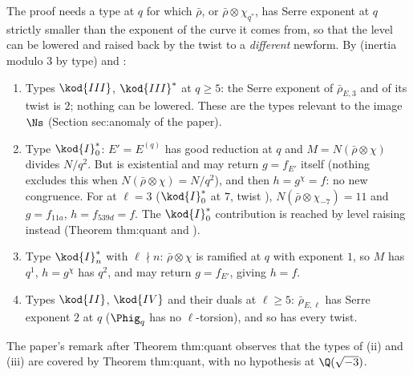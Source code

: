 \begin{remark}\label{rem:modgalrep:why-these-types}
The proof needs a type at $q$ for which $\bar\rho$, or $\bar\rho\otimes\chi_{q^*}$, has Serre exponent at $q$ strictly smaller than the exponent of the curve it comes from, so that
the level can be lowered and raised back by the twist to a \emph{different} newform. By  (inertia modulo $3$ by type) and
:
\begin{enumerate}[label=(\roman*)]
\item Types $\kod{III}$, $\kod{III}^*$ at $q\ge5$: the Serre exponent of $\bar\rho_{E,3}$ and of its twist is $2$; nothing can be lowered. These are the types relevant to the image
$\Ns$ (Section sec:anomaly of the paper).
\item Type $\kod{I}_0^*$: $E'=E^{(q)}$ has good reduction at $q$ and $M=N(\bar\rho\otimes\chi)$ divides $N/q^2$. But  is existential and may return
$g=f_{E'}$ itself (nothing excludes this when $N(\bar\rho\otimes\chi)=N/q^2$), and then $h=g^\chi=f$: no new congruence. For  at $\ell=3$ ($\kod{I}_0^*$ at $7$, twist ), $N(\bar\rho\otimes\chi_{-7})=11$ and
$g=f_{11a}$, $h=f_{539d}=f$. The $\kod{I}_0^*$ contribution is reached by level raising instead (Theorem thm:quant and ).
\item Type $\kod{I}_n^*$ with $\ell\nmid n$: $\bar\rho\otimes\chi$ is ramified at $q$ with exponent $1$, so $M$ has $q^1$, $h=g^\chi$ has $q^2$, and  may
return $g=f_{E'}$, giving $h=f$.
\item Types $\kod{II}$, $\kod{IV}$ and their duals at $\ell\ge5$: $\bar\rho_{E,\ell}$ has Serre exponent $2$ at $q$ ($\Phig_q$ has no $\ell$-torsion), and so has every twist.
\end{enumerate}
The paper's remark after Theorem thm:quant observes that the types of (ii) and (iii) are covered by Theorem thm:quant, with no hypothesis at $\Q(\sqrt{-3})$.
\end{remark}

